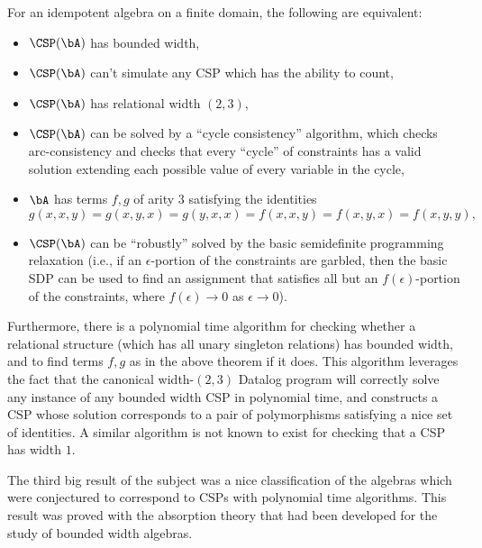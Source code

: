 \begin{thm} For an idempotent algebra on a finite domain, the following are equivalent:
\begin{itemize}
\item $\CSP(\bA)$ has bounded width,

\item $\CSP(\bA)$ can't simulate any CSP which has the ability to count,

\item $\CSP(\bA)$ has relational width $(2,3)$,

\item $\CSP(\bA)$ can be solved by a ``cycle consistency'' algorithm, which checks arc-consistency and checks that every ``cycle'' of constraints has a valid solution extending each possible value of every variable in the cycle,

\item $\bA$ has terms $f,g$ of arity $3$ satisfying the identities
\[
g(x,x,y) = g(x,y,x) = g(y,x,x) = f(x,x,y) = f(x,y,x) = f(x,y,y),
\]

\item $\CSP(\bA)$ can be ``robustly'' solved by the basic semidefinite programming relaxation (i.e., if an $\epsilon$-portion of the constraints are garbled, then the basic SDP can be used to find an assignment that satisfies all but an $f(\epsilon)$-portion of the constraints, where $f(\epsilon) \rightarrow 0$ as $\epsilon \rightarrow 0$).
\end{itemize}
\end{thm}

Furthermore, there is a polynomial time algorithm for checking whether a relational structure (which has all unary singleton relations) has bounded width, and to find terms $f,g$ as in the above theorem if it does. This algorithm leverages the fact that the canonical width-$(2,3)$ Datalog program will correctly solve any instance of any bounded width CSP in polynomial time, and constructs a CSP whose solution corresponds to a pair of polymorphisms satisfying a nice set of identities. A similar algorithm is not known to exist for checking that a CSP has width $1$.

The third big result of the subject was a nice classification of the algebras which were conjectured to correspond to CSPs with polynomial time algorithms. This result was proved with the absorption theory that had been developed for the study of bounded width algebras.

